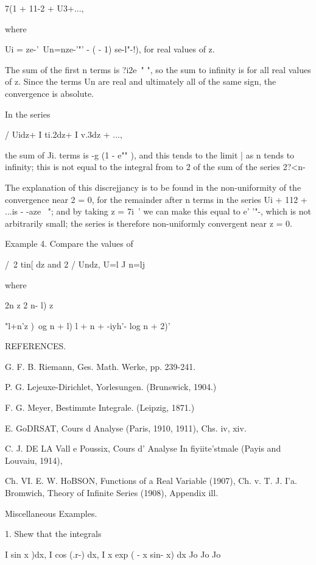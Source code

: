 7(1 + 11-2 + U3+...,

where

Ui = ze-'\ Un=nze-'"' - ( - 1) se-l"-!), for real values of z.

The sum of the first n terms is ?i2e~" ", so the sum to infinity is
for all real values of z. Since the terms Un are real and ultimately
all of the same sign, the convergence is absolute.

In the series

/ Uidz+ I ti.2dz+ I v.3dz + ...,

the sum of Ji. terms is -g (1 - e"" ), and this tends to the limit |
as n tends to infinity; this is not equal to the integral from to 2
of the sum of the series 2?<n-

The explanation of this discrejjancy is to be found in the
non-uniformity of the convergence near 2 = 0, for the remainder after
n terms in the series Ui + 112 + ...is - -aze~ "; and by taking z =
7i~' we can make this equal to e' '"-, which is not arbitrarily small;
the series is therefore non-uniformly convergent near z = 0.

Example 4. Compare the values of

/\ 2 tin[ dz and 2 / Undz, U=l J n=lj

where

2n z 2 n- l) z

"l+n'z )\ og n + l) l + n + -iyh'- log n + 2)'


REFERENCES.

G. F. B. Riemann, Ges. Math. Werke, pp. 239-241.

P. G. Lejeuxe-Dirichlet, Yorlesungen. (Brunswick, 1904.)

F. G. Meyer, Bestimmte Integrale. (Leipzig, 1871.)

E. GoDRSAT, Cours d Analyse (Paris, 1910, 1911), Chs. iv, xiv.

C. J. DE LA Vall e Poussix, Cours d' Analyse In fiyiite'stmale (Payis
and Louvaiu, 1914),

Ch. VI. E. W. HoBSON, Functions of a Real Variable (1907), Ch. v. T.
J. I'a. Bromwich, Theory of Infinite Series (1908), Appendix ill.

%
%

Miscellaneous Examples.

1. Shew that the integrals

I sin x )dx, I cos (.r-) dx, I x exp ( - x sin- x) dx Jo Jo Jo

